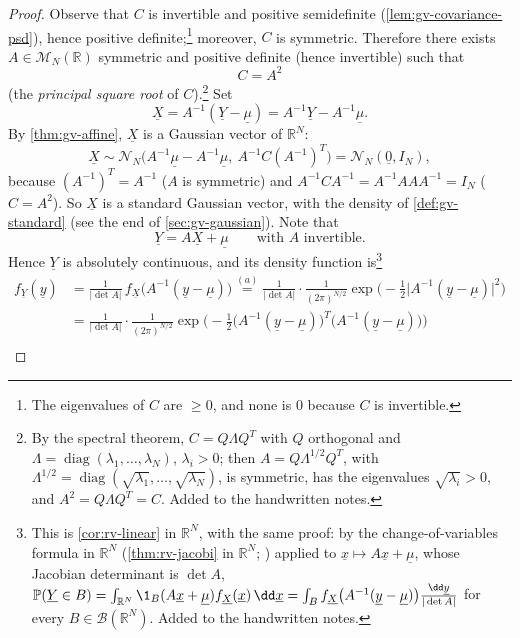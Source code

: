 \begin{proof}
Observe that $C$ is invertible and positive semidefinite (\cref{lem:gv-covariance-psd}), hence
positive definite;\footnote{The eigenvalues of $C$ are $\ge0$, and none is $0$ because $C$ is
invertible.} moreover, $C$ is symmetric. Therefore there exists $A\in\mathcal M_N(\mathbb R)$
symmetric and positive definite (hence invertible) such that
\[
  C=A^2
\]
(the \emph{principal square root} of $C$).\footnote{By the spectral theorem, $C=Q\Lambda Q^T$ with
$Q$ orthogonal and $\Lambda=\operatorname{diag}(\lambda_1,\dots,\lambda_N)$, $\lambda_i>0$; then
$A=Q\Lambda^{1/2}Q^T$, with $\Lambda^{1/2}=\operatorname{diag}(\sqrt{\lambda_1},\dots,\sqrt{\lambda_N})$,
is symmetric, has the eigenvalues $\sqrt{\lambda_i}>0$, and $A^2=Q\Lambda Q^T=C$. Added to the
handwritten notes.} Set
\[
  \underline X=A^{-1}(\underline Y-\underline\mu)=A^{-1}\underline Y-A^{-1}\underline\mu .
\]
By \cref{thm:gv-affine}, $\underline X$ is a Gaussian vector of $\mathbb R^N$:
\[
  \underline X\sim\mathcal N_N\big(A^{-1}\underline\mu-A^{-1}\underline\mu,\ A^{-1}C(A^{-1})^T\big)
  =\mathcal N_N(\underline 0,I_N),
\]
because $(A^{-1})^T=A^{-1}$ ($A$ is symmetric) and $A^{-1}CA^{-1}=A^{-1}AAA^{-1}=I_N$ ($C=A^2$).
So $\underline X$ is a standard Gaussian vector, with the density of \cref{def:gv-standard} (see the
end of \cref{sec:gv-gaussian}). Note that
\[
  \underline Y=A\underline X+\underline\mu\qquad\text{with $A$ invertible.}
\]
Hence $\underline Y$ is absolutely continuous, and its density function is\footnote{This is
\cref{cor:rv-linear} in $\mathbb R^N$, with the same proof: by the change-of-variables formula in
$\mathbb R^N$ (\cref{thm:rv-jacobi} in $\mathbb R^N$; \citet[Theorem~2.47]{folland}) applied to
$\underline x\mapsto A\underline x+\underline\mu$, whose Jacobian determinant is $\det A$,
$\mathbb P(\underline Y\in B)=\int_{\mathbb R^N}\1_B(A\underline x+\underline\mu)f_{\underline X}(\underline x)\,\dd\underline x
=\int_B f_{\underline X}\big(A^{-1}(\underline y-\underline\mu)\big)\frac{\dd\underline y}{|\det A|}$
for every $B\in\mathcal B(\mathbb R^N)$. Added to the handwritten notes.}
\[
\begin{aligned}
  f_{\underline Y}(\underline y)&=\frac1{|\det A|}\,f_{\underline X}\big(A^{-1}(\underline y-\underline\mu)\big)
  \overset{(a)}{=}\frac1{|\det A|}\cdot\frac1{(2\pi)^{N/2}}\exp\Big(-\frac12\big|A^{-1}(\underline y-\underline\mu)\big|^2\Big)\\
  &=\frac1{|\det A|}\cdot\frac1{(2\pi)^{N/2}}\exp\Big(-\frac12\big(A^{-1}(\underline y-\underline\mu)\big)^T\big(A^{-1}(\underline y-\underline\mu)\big)\Big)\\

\end{aligned}\]
\end{proof}
